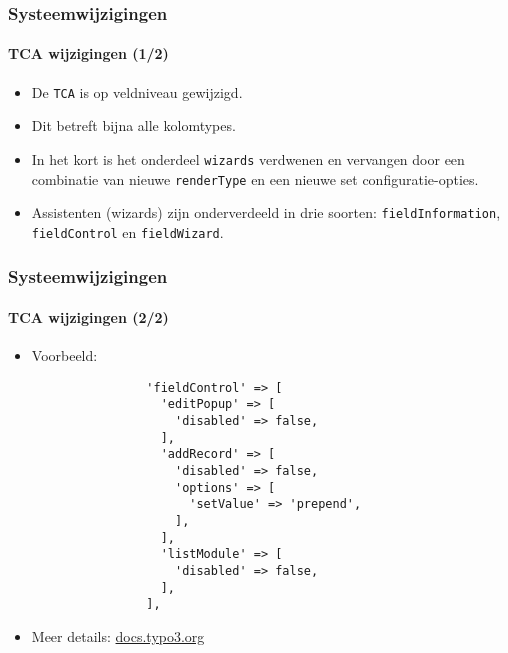 
\begin{frame}[fragile]
	\frametitle{Systeemwijzigingen}
	\framesubtitle{TCA wijzigingen (1/2)}

	\begin{itemize}

		\item De \texttt{TCA} is op veldniveau gewijzigd.

		\item Dit betreft bijna alle kolomtypes.

		\item In het kort is het onderdeel \texttt{wizards} verdwenen en vervangen door een combinatie
		 	van nieuwe \texttt{renderType} en een nieuwe set configuratie-opties.

		\item Assistenten (wizards) zijn onderverdeeld in drie soorten: \texttt{fieldInformation},
		 	\texttt{fieldControl} en \texttt{fieldWizard}.

	\end{itemize}

\end{frame}

\begin{frame}[fragile]
	\frametitle{Systeemwijzigingen}
	\framesubtitle{TCA wijzigingen (2/2)}

	\lstset{basicstyle=\tiny\ttfamily}

	\begin{itemize}
		\item Voorbeeld:

			\begin{lstlisting}
				'fieldControl' => [
				  'editPopup' => [
				    'disabled' => false,
				  ],
				  'addRecord' => [
				    'disabled' => false,
				    'options' => [
				      'setValue' => 'prepend',
				    ],
				  ],
				  'listModule' => [
				    'disabled' => false,
				  ],
				],
			\end{lstlisting}

		\item Meer details:
			\href{https://docs.typo3.org/typo3cms/extensions/core/8-dev/singlehtml/Index.html#deprecation-79440-formengine-element-expansion}{docs.typo3.org}

	\end{itemize}

\end{frame}



